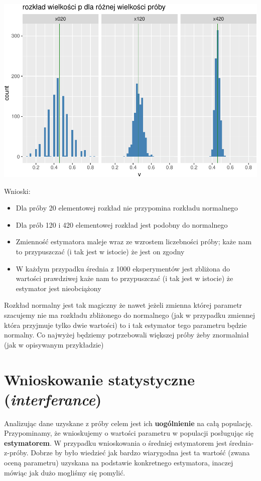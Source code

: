 \documentclass[
  openany]{book}
\begin{document}
\includegraphics{_main_files/figure-latex/unnamed-chunk-38-1.pdf}

Wnioski:

\begin{itemize}
\item
  Dla próby 20 elementowej rozkład nie przypomina rozkładu normalnego
\item
  Dla prób 120 i 420 elementowej rozkład jest podobny do normalnego
\item
  Zmienność estymatora maleje wraz ze wzrostem liczebności próby;
  każe nam to przypuszczać (i tak jest w istocie) że jest on zgodny
\item
  W każdym przypadku średnia z 1000 eksperymentów jest zbliżona do wartości prawdziwej
  każe nam to przypuszczać (i tak jest w istocie) że estymator jest nieobciążony
\end{itemize}

Rozkład normalny jest tak magiczny że nawet jeżeli zmienna której parametr
szacujemy nie ma rozkładu zbliżonego
do normalnego (jak w przypadku zmiennej która przyjmuje tylko dwie wartości)
to i tak estymator tego parametru będzie normalny. Co najwyżej będziemy
potrzebowali większej próby żeby znormalniał (jak w opisywanym przykładzie)

\hypertarget{wnioskowanie-statystyczne-interferance}{%
\section{\texorpdfstring{Wnioskowanie statystyczne (\emph{interferance})}{Wnioskowanie statystyczne (interferance)}}\label{wnioskowanie-statystyczne-interferance}}

Analizując dane uzyskane z próby celem jest ich \textbf{uogólnienie} na całą populację.
Przypominamy, że wnioskujemy
o wartości parametru w populacji posługując się \textbf{estymatorem}. W przypadku
wnioskowania o średniej estymatorem jest średnia-z-próby.
Dobrze by było wiedzieć jak bardzo wiarygodna jest ta wartość (zwana oceną parametru) uzyskana
na podstawie konkretnego estymatora, inaczej mówiąc jak dużo mogliśmy się pomylić.
\end{document}

